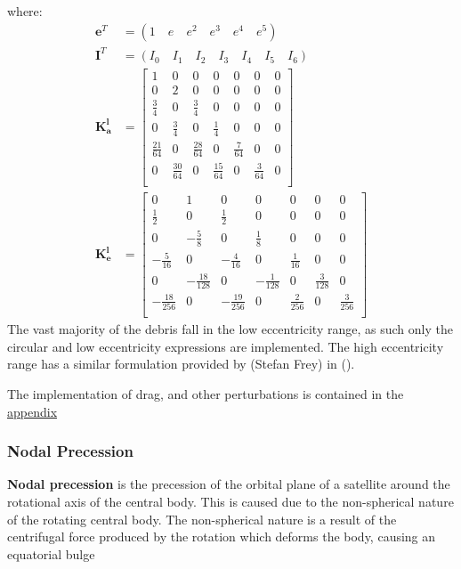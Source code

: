 \documentclass{article}
\newcommand{\boldindex}[1]{%
	\textbf{#1}\index{#1}%
}
\begin{document}
where:\begin{align}
	 \boldsymbol{e}^T &=(1\quad  e\quad e^2\quad e^3\quad e^4\quad e^5)\\
	\boldsymbol{I}^T &=(I_0\quad  I_1\quad I_2\quad I_3\quad I_4\quad I_5\quad I_6)\\
	\boldsymbol{K_a^l} &= \begin{bmatrix}
		1 & 0 & 0 & 0 &0&0 &0\\
		0 & 2 & 0 & 0 &0&0 &0\\
		\frac{3}{4} & 0 & \frac{3}{4} & 0 &0&0 &0\\
		0 & \frac{3}{4} & 0 & \frac{1}{4} &0&0 &0\\
	    \frac{21}{64} & 0 & \frac{28}{64} & 0 &\frac{7}{64}&0 &0\\
	    0 & \frac{30}{64} & 0 & \frac{15}{64} &0&\frac{3}{64} &0\\
	\end{bmatrix}\\
	\boldsymbol{K_e^l} &= \begin{bmatrix}
		0 & 1 & 0 & 0 &0&0 &0\\
		\frac{1}{2} & 0 & \frac{1}{2} & 0 &0&0 &0\\
		0 & -\frac{5}{8}  & 0 & \frac{1}{8}  &0&0 &0\\
		-\frac{5}{16}  & 0 & -\frac{4}{16}  &0 &\frac{1}{16} &0 &0\\
		0 & -\frac{18}{128} & 0& -\frac{1}{128}  &0&\frac{3}{128}  &0\\
		-\frac{18}{256}  & 0 & -\frac{19}{256}  & 0 &\frac{2}{256} &0 &\frac{3}{256} \\
	\end{bmatrix}
\end{align}
The vast majority of the debris fall in the low eccentricity range, as such only the circular and low eccentricity expressions are implemented. The high eccentricity range has a similar formulation provided by (Stefan Frey) in ().

The implementation of drag, and other perturbations is contained in the \hyperref[subsec:propagation]{appendix}

\subsubsection{Nodal Precession}

\boldindex{Nodal precession} is the precession of the orbital plane of a satellite around the rotational axis of the central body. This is caused due to the non-spherical nature of the rotating central body. The non-spherical nature is a result of the centrifugal force produced by the rotation which  deforms the body, causing an equatorial bulge
\end{document}
